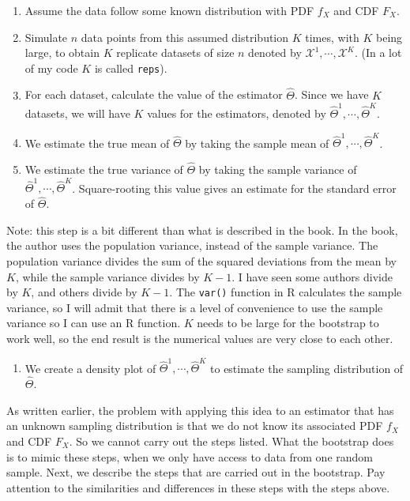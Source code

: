 \documentclass[
]{book}
\providecommand{\tightlist}{%
  \setlength{\itemsep}{0pt}\setlength{\parskip}{0pt}}
\begin{document}
\begin{enumerate}
\def\labelenumi{\arabic{enumi}.}
\item
  Assume the data follow some known distribution with PDF \(f_X\) and CDF \(F_X\).
\item
  Simulate \(n\) data points from this assumed distribution \(K\) times, with \(K\) being large, to obtain \(K\) replicate datasets of size \(n\) denoted by \(\mathcal{X}^{1}, \cdots, \mathcal{X}^{K}\). (In a lot of my code \(K\) is called \texttt{reps}).
\item
  For each dataset, calculate the value of the estimator \(\hat{\Theta}\). Since we have \(K\) datasets, we will have \(K\) values for the estimators, denoted by \(\hat{\Theta}^{1}, \cdots, \hat{\Theta}^{K}\).
\item
  We estimate the true mean of \(\hat{\Theta}\) by taking the sample mean of \(\hat{\Theta}^{1}, \cdots, \hat{\Theta}^{K}\).
\item
  We estimate the true variance of \(\hat{\Theta}\) by taking the sample variance of \(\hat{\Theta}^{1}, \cdots, \hat{\Theta}^{K}\). Square-rooting this value gives an estimate for the standard error of \(\hat{\Theta}\).
\end{enumerate}

Note: this step is a bit different than what is described in the book. In the book, the author uses the population variance, instead of the sample variance. The population variance divides the sum of the squared deviations from the mean by \(K\), while the sample variance divides by \(K-1\). I have seen some authors divide by \(K\), and others divide by \(K-1\). The \texttt{var()} function in R calculates the sample variance, so I will admit that there is a level of convenience to use the sample variance so I can use an R function. \(K\) needs to be large for the bootstrap to work well, so the end result is the numerical values are very close to each other.

\begin{enumerate}
\def\labelenumi{\arabic{enumi}.}
\setcounter{enumi}{5}
\tightlist
\item
  We create a density plot of \(\hat{\Theta}^{1}, \cdots, \hat{\Theta}^{K}\) to estimate the sampling distribution of \(\hat{\Theta}\).
\end{enumerate}

As written earlier, the problem with applying this idea to an estimator that has an unknown sampling distribution is that we do not know its associated PDF \(f_X\) and CDF \(F_X\). So we cannot carry out the steps listed. What the bootstrap does is to mimic these steps, when we only have access to data from one random sample. Next, we describe the steps that are carried out in the bootstrap. Pay attention to the similarities and differences in these steps with the steps above.
\end{document}
